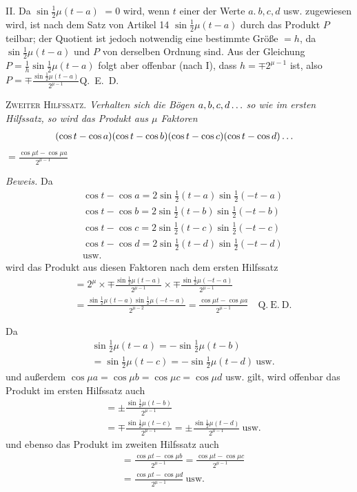 II. Da \(\sin\frac12\mu(t-a)\) \(=0\) wird, wenn \(t\) einer der Werte \(a.\ b,c,d\) usw.
zugewiesen wird, ist nach dem Satz von Artikel 14 \(\sin\frac12\mu(t-a)\) durch das Produkt \(P\) teilbar;
der Quotient ist jedoch notwendig eine bestimmte Größe \(=h\), da \(\sin\frac12\mu(t-a)\) und \(P\)
von derselben Ordnung sind. Aus der Gleichung \(P=\frac1h\sin\frac12\mu(t-a)\) folgt aber offenbar (nach I),
dass \(h=\mp2^{\mu-1}\) ist, also \(P=\mp\frac{\sin\frac12\mu(t-a)}{2^{\mu-1}}\)\quad Q.~E.~D.

\textsc{Zweiter Hilfssatz.} \emph{Verhalten sich die Bögen \(a,b,c,d\mathinner{.\,.\,.}\) so wie im ersten Hilfssatz, so wird das Produkt aus \(\mu\) Faktoren}
\[
\begin{aligned}
&(\cos t-\cos a)(\cos t-\cos b)(\cos t-\cos c)(\cos t-\cos d)\mathinner{.\,.\,.}
\end{aligned}
\]
\noindent\emph{\(=\frac{\cos\mu t-\cos\mu a}{2^{\mu-1}}\)}

\emph{Beweis.} Da
\[
\begin{aligned}
&\cos t-\cos a=2\sin\frac12(t-a)\sin\frac12(-t-a)\\[5pt]
&\cos t-\cos b=2\sin\frac12(t-b)\sin\frac12(-t-b)\\[5pt]
&\cos t-\cos c=2\sin\frac12(t-c)\sin\frac12(-t-c)\\[5pt]
&\cos t-\cos d=2\sin\frac12(t-d)\sin\frac12(-t-d)\\[5pt]
&\mathrm{usw.}
\end{aligned}
\]
\noindent wird das Produkt aus diesen Faktoren nach dem ersten Hilfssatz
\[
\begin{aligned}
&=2^{\mu}\times\mp\frac{\sin\frac12\mu(t-a)}{2^{\mu-1}}\times\mp\frac{\sin\frac12\mu(-t-a)}{2^{\mu-1}}\\[5pt]
&=\frac{\sin\frac12\mu(t-a)\sin\frac12\mu(-t-a)}{2^{\mu-2}}=\frac{\cos\mu t-\cos\mu a}{2^{\mu-1}}\quad\mathrm{Q.\ E.\ D.}
\end{aligned}
\]

Da
\[
\begin{aligned}
&\sin\frac12\mu(t-a)=-\sin\frac12\mu(t-b)\\[5pt]&=\sin\frac12\mu(t-c)=-\sin\frac12\mu(t-d)\ \mathrm{usw.}
\end{aligned}
\]
\noindent und außerdem \(\cos\mu a=\cos\mu b=\cos\mu c=\cos\mu d\) usw. gilt, wird offenbar das Produkt
im ersten Hilfssatz auch
\[
\begin{aligned}
&=\pm\frac{\sin\frac12\mu(t-b)}{2^{\mu-1}}\\[5pt]&=\mp\frac{\sin\frac12\mu(t-c)}{2^{\mu-1}}=\pm\frac{\sin\frac12\mu(t-d)}{2^{\mu-1}}\ \mathrm{usw.}
\end{aligned}
\]
\noindent und ebenso das Produkt im zweiten Hilfssatz auch
\[
\begin{aligned}
&=\frac{\cos\mu t-\cos\mu b}{2^{\mu-1}}=\frac{\cos\mu t-\cos\mu c}{2^{\mu-1}}\\[5pt]&=\frac{\cos\mu t-\cos\mu d}{2^{\mu-1}}\ \mathrm{usw.}
\end{aligned}
\]

\endgroup
